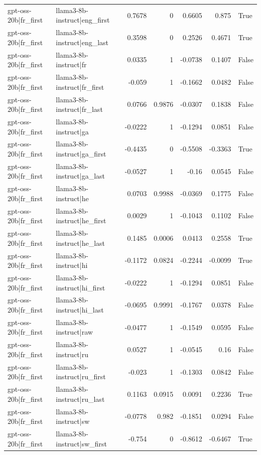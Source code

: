 \begin{table}
\begin{tabular}{l l r r r r l}
gpt-oss-20b|fr_first & llama3-8b-instruct|eng_first & 0.7678 & 0 & 0.6605 & 0.875 & True \\
gpt-oss-20b|fr_first & llama3-8b-instruct|eng_last & 0.3598 & 0 & 0.2526 & 0.4671 & True \\
gpt-oss-20b|fr_first & llama3-8b-instruct|fr & 0.0335 & 1 & -0.0738 & 0.1407 & False \\
gpt-oss-20b|fr_first & llama3-8b-instruct|fr_first & -0.059 & 1 & -0.1662 & 0.0482 & False \\
gpt-oss-20b|fr_first & llama3-8b-instruct|fr_last & 0.0766 & 0.9876 & -0.0307 & 0.1838 & False \\
gpt-oss-20b|fr_first & llama3-8b-instruct|ga & -0.0222 & 1 & -0.1294 & 0.0851 & False \\
gpt-oss-20b|fr_first & llama3-8b-instruct|ga_first & -0.4435 & 0 & -0.5508 & -0.3363 & True \\
gpt-oss-20b|fr_first & llama3-8b-instruct|ga_last & -0.0527 & 1 & -0.16 & 0.0545 & False \\
gpt-oss-20b|fr_first & llama3-8b-instruct|he & 0.0703 & 0.9988 & -0.0369 & 0.1775 & False \\
gpt-oss-20b|fr_first & llama3-8b-instruct|he_first & 0.0029 & 1 & -0.1043 & 0.1102 & False \\
gpt-oss-20b|fr_first & llama3-8b-instruct|he_last & 0.1485 & 0.0006 & 0.0413 & 0.2558 & True \\
gpt-oss-20b|fr_first & llama3-8b-instruct|hi & -0.1172 & 0.0824 & -0.2244 & -0.0099 & True \\
gpt-oss-20b|fr_first & llama3-8b-instruct|hi_first & -0.0222 & 1 & -0.1294 & 0.0851 & False \\
gpt-oss-20b|fr_first & llama3-8b-instruct|hi_last & -0.0695 & 0.9991 & -0.1767 & 0.0378 & False \\
gpt-oss-20b|fr_first & llama3-8b-instruct|raw & -0.0477 & 1 & -0.1549 & 0.0595 & False \\
gpt-oss-20b|fr_first & llama3-8b-instruct|ru & 0.0527 & 1 & -0.0545 & 0.16 & False \\
gpt-oss-20b|fr_first & llama3-8b-instruct|ru_first & -0.023 & 1 & -0.1303 & 0.0842 & False \\
gpt-oss-20b|fr_first & llama3-8b-instruct|ru_last & 0.1163 & 0.0915 & 0.0091 & 0.2236 & True \\
gpt-oss-20b|fr_first & llama3-8b-instruct|sw & -0.0778 & 0.982 & -0.1851 & 0.0294 & False \\
gpt-oss-20b|fr_first & llama3-8b-instruct|sw_first & -0.754 & 0 & -0.8612 & -0.6467 & True \\

\end{tabular}
\end{table}
